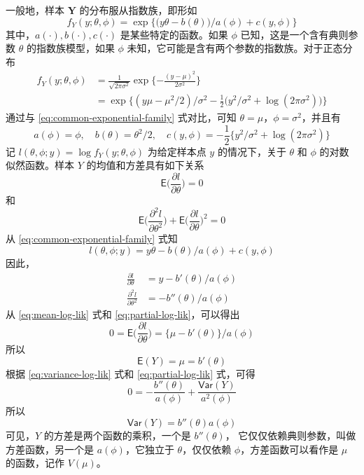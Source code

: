 \documentclass[12pt,a4paper,UTF8,twoside]{book}
\theoremstyle{definition}
\theoremstyle{definition}
\theoremstyle{definition}
\theoremstyle{remark}
\begin{document}
一般地，样本 \(\mathbf{Y}\) 的分布服从指数族，即形如 \begin{equation}
f_{Y}(y;\theta,\phi) = \exp\big\{ \big(y\theta - b(\theta) \big)/a(\phi) + c(y,\phi) \big\}
\label{eq:common-exponential-family}
\end{equation} \noindent 其中，\(a(\cdot),b(\cdot),c(\cdot)\)
是某些特定的函数。如果 \(\phi\) 已知，这是一个含有典则参数 \(\theta\)
的指数族模型，如果 \(\phi\)
未知，它可能是含有两个参数的指数族。对于正态分布 \begin{equation}
\begin{aligned}
f_{Y}(y;\theta,\phi) & = \frac{1}{\sqrt{2\pi\sigma^2}} \exp\{-\frac{(y - \mu)^2}{2\sigma^2}  \}  \\
 & = \exp\big \{ (y\mu - \mu^2/2)/\sigma^2 - \frac{1}{2}\big(y^2/\sigma^2 + \log(2\pi\sigma^2)\big) \big\}
\end{aligned} \label{eq:normal-distribution}
\end{equation} \noindent 通过与 \eqref{eq:common-exponential-family}
式对比，可知 \(\theta = \mu\)，\(\phi = \sigma^2\)，并且有 \[
a(\phi) = \phi, \quad b(\theta) = \theta^2/2, \quad c(y,\phi) = - \frac{1}{2}\{ y^2/\sigma^2 + \log(2\pi\sigma^2) \} 
\] \noindent 记 \(l(\theta,\phi;y) = \log f_{Y}(y;\theta,\phi)\)
为给定样本点 \(y\) 的情况下，关于 \(\theta\) 和 \(\phi\)
的对数似然函数。样本 \(Y\) 的均值和方差具有如下关系 \begin{equation}
\mathsf{E}\big( \frac{\partial l}{\partial \theta} \big) = 0
\label{eq:mean-log-lik}
\end{equation} \noindent 和 \begin{equation}
\mathsf{E}\big( \frac{\partial^2 l}{\partial \theta^2} \big) + \mathsf{E}\big(\frac{\partial l}{\partial \theta}\big)^2  = 0
\label{eq:variance-log-lik}
\end{equation} \noindent 从 \eqref{eq:common-exponential-family} 式知
\[ l(\theta,\phi;y) = {y\theta - b(\theta)}/a(\phi) + c(y,\phi) \]
\noindent 因此， \begin{equation}
\begin{aligned}
\frac{\partial l}{\partial \theta} & = {y - b'(\theta)}/a(\phi)  \\
\frac{\partial^2 l}{\partial \theta^2}  & = - b''(\theta)/a(\phi)
\end{aligned} \label{eq:partial-log-lik}
\end{equation} \noindent 从 \eqref{eq:mean-log-lik} 式和
\eqref{eq:partial-log-lik}，可以得出 \[ 
0 = \mathsf{E}\big( \frac{\partial l}{\partial \theta} \big) = \big\{ \mu - b'(\theta) \big\}/a(\phi)
\] \noindent 所以 \[ \mathsf{E}(Y) = \mu = b'(\theta) \] \noindent 根据
\eqref{eq:variance-log-lik} 式和 \eqref{eq:partial-log-lik} 式，可得
\[ 0 = - \frac{b''(\theta)}{a(\phi)} + \frac{\mathsf{Var}(Y)}{a^2(\phi)} \]
\noindent 所以 \[ \mathsf{Var}(Y) = b''(\theta)a(\phi) \] 可见，\(Y\)
的方差是两个函数的乘积，一个是 \(b''(\theta)\)，
它仅仅依赖典则参数，叫做方差函数，另一个是 \(a(\phi)\)，它独立于
\(\theta\)，仅仅依赖 \(\phi\)，方差函数可以看作是 \(\mu\) 的函数，记作
\(V(\mu)\)。
\end{document}
